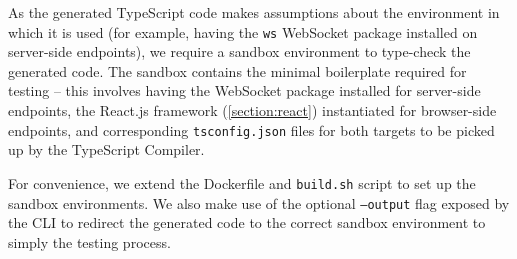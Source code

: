 As the generated TypeScript code makes assumptions about the
environment in which it is used (for example, having the \texttt{ws}
WebSocket package installed on server-side endpoints), we require a
sandbox environment to type-check the generated code. 
The sandbox contains the minimal boilerplate required
for testing -- this involves having the WebSocket package installed
for server-side endpoints, the React.js framework (\cref{section:react})
instantiated for browser-side endpoints,
and corresponding \texttt{tsconfig.json} files for both targets to
be picked up by the TypeScript Compiler.

For convenience, we extend the
Dockerfile and \texttt{build.sh} script 
to set up the sandbox environments. 
We also make use of the optional
\texttt{--output} flag exposed by the  CLI
to redirect the generated code to the correct sandbox environment
to simply the testing process.